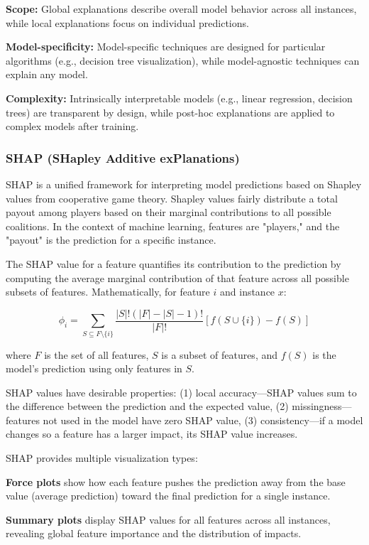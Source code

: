 \textbf{Scope:} Global explanations describe overall model behavior across all instances, while local explanations focus on individual predictions.

\textbf{Model-specificity:} Model-specific techniques are designed for particular algorithms (e.g., decision tree visualization), while model-agnostic techniques can explain any model.

\textbf{Complexity:} Intrinsically interpretable models (e.g., linear regression, decision trees) are transparent by design, while post-hoc explanations are applied to complex models after training.

\subsubsection{SHAP (SHapley Additive exPlanations)}

SHAP is a unified framework for interpreting model predictions based on Shapley values from cooperative game theory. Shapley values fairly distribute a total payout among players based on their marginal contributions to all possible coalitions. In the context of machine learning, features are "players," and the "payout" is the prediction for a specific instance.

The SHAP value for a feature quantifies its contribution to the prediction by computing the average marginal contribution of that feature across all possible subsets of features. Mathematically, for feature $i$ and instance $x$:

$$\phi_i = \sum_{S \subseteq F \setminus \{i\}} \frac{|S|!(|F|-|S|-1)!}{|F|!} [f(S \cup \{i\}) - f(S)]$$

where $F$ is the set of all features, $S$ is a subset of features, and $f(S)$ is the model's prediction using only features in $S$.

SHAP values have desirable properties: (1) local accuracy—SHAP values sum to the difference between the prediction and the expected value, (2) missingness—features not used in the model have zero SHAP value, (3) consistency—if a model changes so a feature has a larger impact, its SHAP value increases.

SHAP provides multiple visualization types:

\textbf{Force plots} show how each feature pushes the prediction away from the base value (average prediction) toward the final prediction for a single instance.

\textbf{Summary plots} display SHAP values for all features across all instances, revealing global feature importance and the distribution of impacts.

